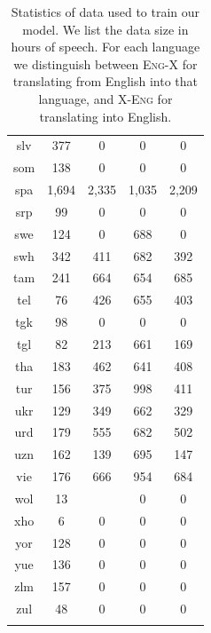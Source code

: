 \begin{table}[!htb]
\begin{minipage}[t]{0.45\textwidth}
\begin{tabular}{@{}ccccc@{}}
        slv & 377 & 0 & 0 & 0 \\
        som & 138 & 0 & 0 & 0 \\
        spa & 1,694 & 2,335 & 1,035 & 2,209 \\
        srp & 99 & 0 & 0 & 0 \\
        swe & 124 & 0 & 688 & 0 \\
        swh & 342 & 411 & 682 & 392 \\
        tam & 241 & 664 & 654 & 685 \\
        tel & 76 & 426 & 655 & 403 \\
        tgk & 98 & 0 & 0 & 0 \\
        tgl & 82 & 213 & 661 & 169 \\
        tha & 183 & 462 & 641 & 408 \\
        tur & 156 & 375 & 998 & 411 \\
        ukr & 129 & 349 & 662 & 329 \\
        urd & 179 & 555 & 682 & 502 \\
        uzn & 162 & 139 & 695 & 147 \\
        vie & 176 & 666 & 954 & 684 \\
        wol & 13 &  & 0 & 0 \\
        xho & 6 & 0 & 0 & 0 \\
        yor & 128 & 0 & 0 & 0 \\
        yue & 136 & 0 & 0 & 0 \\
        zlm & 157 & 0 & 0 & 0 \\
        zul & 48 & 0 & 0 & 0 \\
        \\
        \bottomrule
    \end{tabular}
    \end{minipage}
    \caption{\small Statistics of \sst{} data used to train our \mfourt{} model. We list the data size in hours of speech. For each language we distinguish between \textsc{Eng-X} for translating from English into that language, and \textsc{X-Eng} for translating into English.
}
\label{tbl:modeling:s2stdata}
\end{table}
